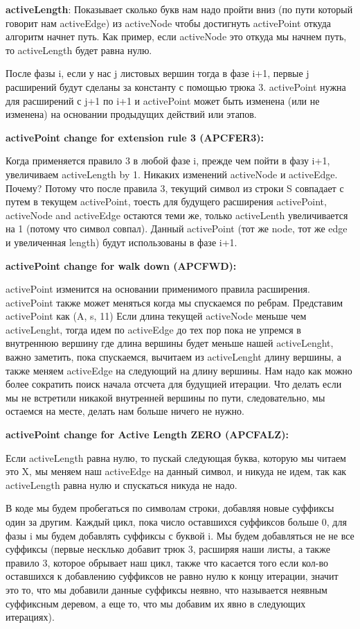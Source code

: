 \textbf{activeLength}: Показывает сколько букв нам надо пройти вниз (по пути который говорит нам activeEdge) из activeNode чтобы достигнуть activePoint откуда алгоритм начнет путь. Как пример, если  activeNode это откуда мы начнем путь, то activeLength будет равна нулю.

После фазы i, если у нас j листовых вершин тогда в фазе i+1, первые j расширений будут сделаны за константу с помощью трюка 3. activePoint нужна для расширений с  j+1 по i+1 и activePoint может быть изменена (или не изменена) на основании продыдущих действий или этапов.

\textbf{activePoint change for extension rule 3 (APCFER3):}

Когда применяется правило 3 в любой фазе i, прежде чем пойти в фазу i+1, увеличиваем activeLength by 1. Никаких изменений activeNode и activeEdge. Почему? Потому что после правила 3, текущий символ из строки S совпадает с путем в текущем activePoint, тоесть для будущего расширения activePoint, activeNode and activeEdge остаются теми же, только activeLenth увеличивается на 1 (потому что символ совпал). Данный activePoint (тот же node, тот же edge и увеличенная length) будут использованы в фазе i+1.

\textbf{activePoint change for walk down (APCFWD):}

activePoint изменится на основании применимого правила расширения. activePoint также может меняться когда мы спускаемся по ребрам. Представим activePoint как (A, s, 11) Если длина текущей activeNode меньше чем activeLenght, тогда идем по activeEdge до тех пор пока не упремся в внутреннюю вершину где длина вершины будет меньше нашей activeLenght, важно заметить, пока спускаемся, вычитаем из activeLenght длину вершины, а также меняем activeEdge на следующий на длину вершины. Нам надо как можно более сократить поиск начала отсчета для будущией итерации. Что делать если мы не встретили никакой внутренней вершины по пути, следовательно, мы остаемся на месте, делать нам больше ничего не нужно.

\textbf{activePoint change for Active Length ZERO (APCFALZ):}

Если activeLength равна нулю, то пускай следующая буква, которую мы читаем это X, мы меняем наш activeEdge на данный символ, и никуда не идем, так как activeLength равна нулю и спускаться никуда не надо.

В коде мы будем пробегаться по символам строки, добавляя новые суффиксы один за другим. Каждый цикл, пока число оставшихся суффиксов больше 0, для фазы i мы будем добавлять суффиксы с буквой i. Мы будем добавляться не не все суффиксы (первые несклько добавит трюк 3, расширяя наши листы, а также правило 3, которое обрывает наш цикл, также что касается того если кол-во оставшихся к добавлению суффиксов не равно нулю к концу итерации, значит это то, что мы добавили данные суффиксы неявно, что называется неявным суффиксным деревом, а еще то, что мы добавим их явно в следующих итерациях).

